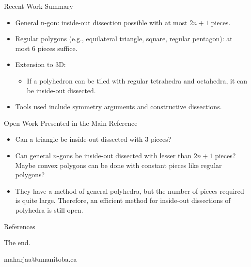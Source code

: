 \documentclass[11pt]{beamer}
\makeatletter
\newcommand{\email}{maharjaa@umanitoba.ca}
\makeatother
\begin{document}
\begin{frame}{Recent Work Summary}
	\begin{itemize}
		\pause
		\item General n-gon: inside-out dissection possible with at most $2n + 1$ pieces.
		      \pause
		\item Regular polygons (e.g., equilateral triangle, square, regular pentagon): at most 6 pieces suffice.
		      \pause
		\item Extension to 3D:
		      \begin{itemize}
			      \item If a polyhedron can be tiled with regular tetrahedra and octahedra, it can be inside-out dissected.
		      \end{itemize}
		      \pause
		\item Tools used include symmetry arguments and constructive dissections.
	\end{itemize}
\end{frame}

\begin{frame}{Open Work Presented in the Main Reference}
	\begin{itemize}
		\pause
		\item Can a triangle be inside-out dissected with 3 pieces?
		      \pause
		\item Can general $n$-gons be inside-out dissected with lesser than $2n + 1$ pieces? Maybe convex polygons can be done with constant pieces like regular polygons?
		      \pause
		\item They have a method of general polyhedra, but the number of pieces required is quite large. Therefore, an efficient method for inside-out dissections of polyhedra is still open.
	\end{itemize}
\end{frame}

\begin{frame}[allowframebreaks]{References}
	
\end{frame}

\begin{frame}

	\begin{center}
		The end.

		\email
	\end{center}

	\begin{figure}[htb]
		\centering
	\end{figure}

\end{frame}
\end{document}
